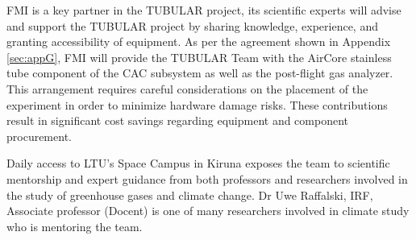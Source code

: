 FMI is a key partner in the TUBULAR project, its scientific experts will advise and support the TUBULAR project by sharing knowledge, experience, and granting accessibility of equipment. As per the agreement shown in Appendix \ref{sec:appG}, FMI will provide the TUBULAR Team with the AirCore stainless tube component of the CAC subsystem as well as the post-flight gas analyzer. This arrangement requires careful considerations on the placement of the experiment in order to minimize hardware damage risks. These contributions result in significant cost savings regarding equipment and component procurement.

Daily access to LTU's Space Campus in Kiruna exposes the team to scientific mentorship and expert guidance from both professors and researchers involved in the study of greenhouse gases and climate change. Dr Uwe Raffalski, IRF, Associate professor (Docent) is one of many researchers involved in climate study who is mentoring the team.